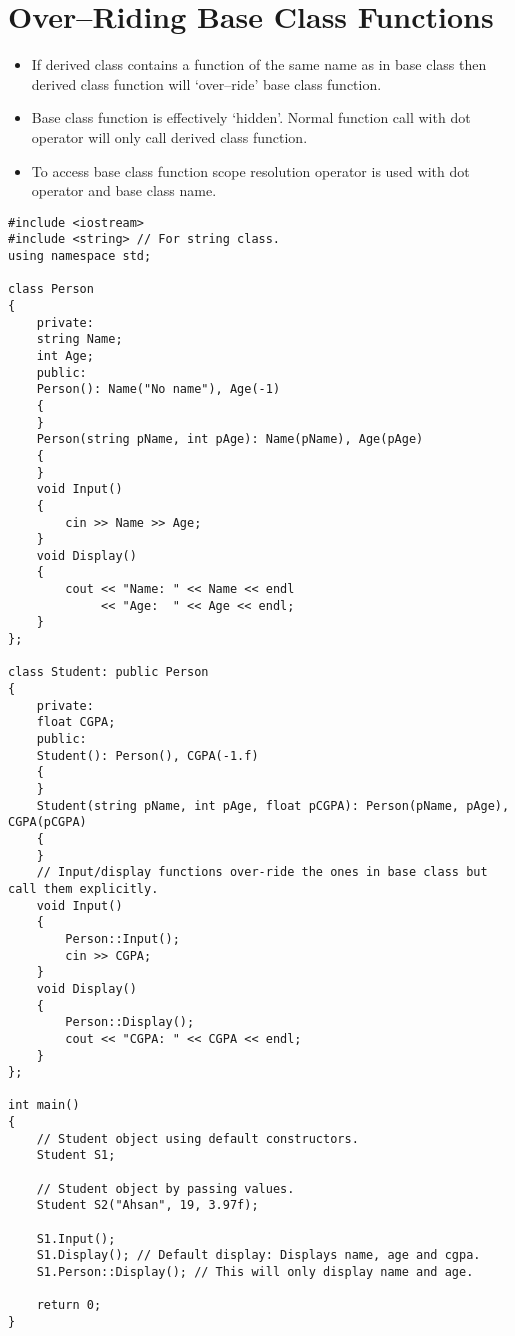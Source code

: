 \documentclass[12pt,a4paper]{article}
\begin{document}
\section{Over--Riding Base Class Functions}
\begin{itemize}
\item If derived class contains a function of the same name as in base class then derived class function will `over--ride' base class function.
\item Base class function is effectively `hidden'. Normal function call with dot operator will only call derived class function.
\item To access base class function scope resolution operator is used with dot operator and base class name.
\end{itemize}
\begin{lstlisting}[caption={Over--Riding Base Class Function}]
#include <iostream>
#include <string> // For string class.
using namespace std;

class Person
{
	private:
	string Name;
	int Age;
	public:
	Person(): Name("No name"), Age(-1)
	{
	}
	Person(string pName, int pAge): Name(pName), Age(pAge)
	{
	}
	void Input()
	{
		cin >> Name >> Age;
	}
	void Display()
	{
		cout << "Name: " << Name << endl
			 << "Age:  " << Age << endl;
	}
};

class Student: public Person
{
	private:
	float CGPA;
	public:
	Student(): Person(), CGPA(-1.f)
	{
	}
	Student(string pName, int pAge, float pCGPA): Person(pName, pAge), CGPA(pCGPA)
	{
	}
	// Input/display functions over-ride the ones in base class but call them explicitly.
	void Input()
	{
		Person::Input();
		cin >> CGPA;
	}
	void Display()
	{
		Person::Display();
		cout << "CGPA: " << CGPA << endl;
	}
};

int main()
{
	// Student object using default constructors.
	Student S1;
	
	// Student object by passing values.
	Student S2("Ahsan", 19, 3.97f);
	
	S1.Input();
	S1.Display(); // Default display: Displays name, age and cgpa.
	S1.Person::Display(); // This will only display name and age.
	
	return 0;
}
\end{lstlisting}


\end{document}

